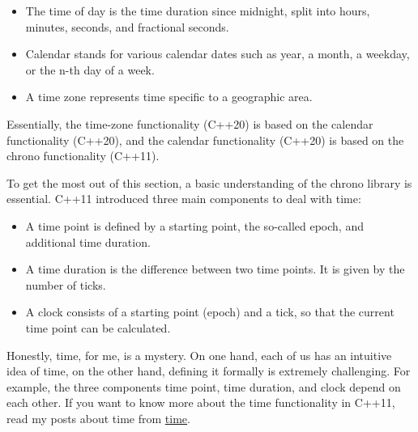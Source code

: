 \begin{itemize}
\item 
The time of day is the time duration since midnight, split into hours, minutes, seconds, and fractional seconds.

\item 
Calendar stands for various calendar dates such as year, a month, a weekday, or the n-th day of a week.

\item 
A time zone represents time specific to a geographic area.
\end{itemize}

Essentially, the time-zone functionality (C++20) is based on the calendar functionality (C++20), and the calendar functionality (C++20) is based on the chrono functionality (C++11).


\begin{tcolorbox}[breakable,enhanced jigsaw,colback=blue!5!white,colframe=blue!75!black,title={Lack of Compiler Support}]
	
To get the most out of this section, a basic understanding of the chrono library is essential.
C++11 introduced three main components to deal with time:

\begin{itemize}
\item 
A time point is defined by a starting point, the so-called epoch, and additional time duration.

\item 
A time duration is the difference between two time points. It is given by the number of ticks.

\item 
A clock consists of a starting point (epoch) and a tick, so that the current time point can be calculated.
\end{itemize}

Honestly, time, for me, is a mystery. On one hand, each of us has an intuitive idea of time, on the other hand, defining it formally is extremely challenging. For example, the three components time point, time duration, and clock depend on each other. If you want to know more about the time functionality in C++11, read my posts about time from \href{https://www.modernescpp.com/index.php/tag/time}{time}.
	
\end{tcolorbox}


